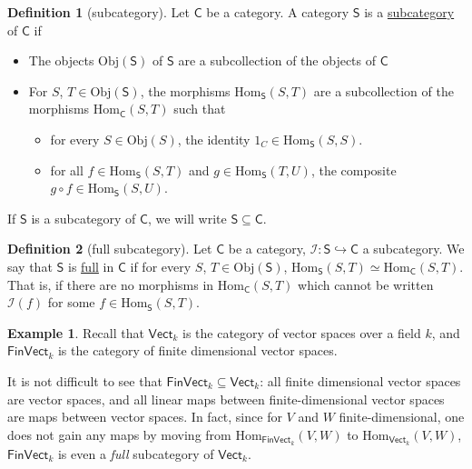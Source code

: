 \documentclass[a4paper,10pt]{scrreprt}
\newcommand{\defn}[1]{\ul{#1}}
\newcommand{\Obj}{\mathrm{Obj}}
\newcommand{\Hom}{\mathrm{Hom}}
\theoremstyle{definition}
\newtheorem{definition}{Definition}[section]
\newtheorem{example}{Example}[section]
\theoremstyle{plain}
\theoremstyle{remark}
\begin{document}
\begin{definition}[subcategory]
  \label{def:subcategory}
  Let $\mathsf{C}$ be a category. A category $\mathsf{S}$ is a \defn{subcategory} of $\mathsf{C}$ if
  \begin{itemize}
    \item The objects $\Obj(\mathsf{S})$ of $\mathsf{S}$ are a subcollection of the objects of $\mathsf{C}$

    \item For $S$, $T \in \Obj(\mathsf{S})$, the morphisms $\Hom_{\mathsf{S}}(S, T)$ are a subcollection of the morphisms $\Hom_{\mathsf{C}}(S, T)$ such that
      \begin{itemize}
        \item for every $S \in \Obj(S)$, the identity $1_{C} \in \Hom_{\mathsf{S}}(S, S)$.

        \item for all $f \in \Hom_{\mathsf{S}}(S, T)$ and $g \in \Hom_{\mathsf{S}}(T, U)$, the composite $g \circ f \in \Hom_{\mathsf{S}}(S, U)$.
      \end{itemize}
  \end{itemize} 

  If $\mathsf{S}$ is a subcategory of $\mathsf{C}$, we will write $\mathsf{S} \subseteq \mathsf{C}$.
\end{definition}

\begin{definition}[full subcategory]
  \label{def:fullsubcategory}
  Let $\mathsf{C}$ be a category, $\mathcal{I}\colon \mathsf{S} \hookrightarrow \mathsf{C}$ a subcategory. We say that $\mathsf{S}$ is \defn{full} in $\mathsf{C}$ if for every $S$, $T \in \Obj(\mathsf{S})$, $\Hom_{\mathsf{S}}(S, T) \simeq \Hom_{\mathsf{C}}(S, T)$. That is, if there are no morphisms in $\Hom_{\mathsf{C}}(S, T)$ which cannot be written $\mathcal{I}(f)$ for some $f \in \Hom_{\mathsf{S}}(S, T)$.
\end{definition}

\begin{example}
  \label{eg:finvectfullsubcategoryofvect}
  Recall that $\mathsf{Vect}_{k}$ is the category of vector spaces over a field $k$, and $\mathsf{FinVect}_{k}$ is the category of finite dimensional vector spaces. 

  It is not difficult to see that $\mathsf{FinVect}_{k} \subseteq \mathsf{Vect}_{k}$: all finite dimensional vector spaces are vector spaces, and all linear maps between finite-dimensional vector spaces are maps between vector spaces. In fact, since for $V$ and $W$ finite-dimensional, one does not gain any maps by moving from $\Hom_{\mathsf{FinVect}_{k}}(V, W)$ to $\Hom_{\mathsf{Vect}_{k}}(V, W)$, $\mathsf{FinVect}_{k}$ is even a \emph{full} subcategory of $\mathsf{Vect}_{k}$.
\end{example}
\end{document}
